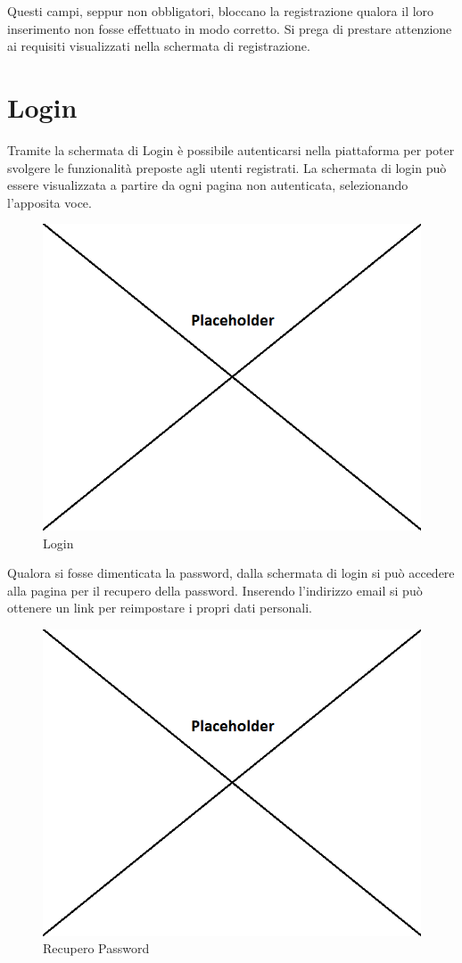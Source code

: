 Questi campi, seppur non obbligatori, bloccano la registrazione qualora il loro inserimento non fosse effettuato in modo corretto. Si prega di prestare attenzione ai requisiti visualizzati nella schermata di registrazione.

\section{Login}

Tramite la schermata di Login è possibile autenticarsi nella piattaforma per poter svolgere le funzionalità preposte agli utenti registrati. La schermata di login può essere visualizzata a partire da ogni pagina non autenticata, selezionando l'apposita voce.

\label{Login}
\begin{figure}[H]
	\centering
	\includegraphics[scale=0.45]{img/login.png}
	\caption{Login}
\end{figure}

Qualora si fosse dimenticata la password, dalla schermata di login si può accedere alla pagina per il recupero della password. Inserendo l'indirizzo email si può ottenere un link per reimpostare i propri dati personali.

\label{Recupero Password}
\begin{figure}[H]
	\centering
	\includegraphics[scale=0.45]{img/recuperopwd.png}
	\caption{Recupero Password}
\end{figure}
